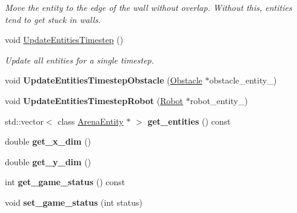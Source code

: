 \begin{DoxyCompactItemize}
\begin{DoxyCompactList}\small\item\em Move the entity to the edge of the wall without overlap. Without this, entities tend to get stuck in walls. \end{DoxyCompactList}\item 
void \hyperlink{classArena_a682ec81cb30e36e5bb801b3388bcb494}{Update\+Entities\+Timestep} ()
\begin{DoxyCompactList}\small\item\em Update all entities for a single timestep. \end{DoxyCompactList}\item 
void {\bfseries Update\+Entities\+Timestep\+Obstacle} (\hyperlink{classObstacle}{Obstacle} $\ast$obstacle\+\_\+entity\+\_\+)\hypertarget{classArena_a897f8f425ae505dbb5d9aaff59f72451}{}\label{classArena_a897f8f425ae505dbb5d9aaff59f72451}

\item 
void {\bfseries Update\+Entities\+Timestep\+Robot} (\hyperlink{classRobot}{Robot} $\ast$robot\+\_\+entity\+\_\+)\hypertarget{classArena_a694f8bbb2c7c235f83f33dbd4eac457f}{}\label{classArena_a694f8bbb2c7c235f83f33dbd4eac457f}

\item 
std\+::vector$<$ class \hyperlink{classArenaEntity}{Arena\+Entity} $\ast$ $>$ {\bfseries get\+\_\+entities} () const \hypertarget{classArena_aabb4ffe05aefc71ee10d47b191963fe5}{}\label{classArena_aabb4ffe05aefc71ee10d47b191963fe5}

\item 
double {\bfseries get\+\_\+x\+\_\+dim} ()\hypertarget{classArena_a5e3be20f2c67338a5a684b85a66f6b96}{}\label{classArena_a5e3be20f2c67338a5a684b85a66f6b96}

\item 
double {\bfseries get\+\_\+y\+\_\+dim} ()\hypertarget{classArena_a35737d65ff32f2bd5871f0bdfbc10a85}{}\label{classArena_a35737d65ff32f2bd5871f0bdfbc10a85}

\item 
int {\bfseries get\+\_\+game\+\_\+status} () const \hypertarget{classArena_a6d196837daa08a2618c3ff6e0a741b25}{}\label{classArena_a6d196837daa08a2618c3ff6e0a741b25}

\item 
void {\bfseries set\+\_\+game\+\_\+status} (int status)\hypertarget{classArena_ac8e8b3438db02aa5395f7fcb537ed952}{}\label{classArena_ac8e8b3438db02aa5395f7fcb537ed952}

\end{DoxyCompactItemize}


